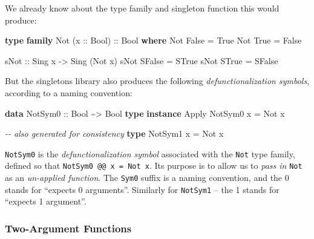 \documentclass[]{article}
\newenvironment{Shaded}{}{}
\newcommand{\CommentTok}[1]{\textcolor[rgb]{0.38,0.63,0.69}{\textit{#1}}}
\newcommand{\DataTypeTok}[1]{\textcolor[rgb]{0.56,0.13,0.00}{#1}}
\newcommand{\KeywordTok}[1]{\textcolor[rgb]{0.00,0.44,0.13}{\textbf{#1}}}
\newcommand{\NormalTok}[1]{#1}
\newcommand{\OperatorTok}[1]{\textcolor[rgb]{0.40,0.40,0.40}{#1}}
\newcommand{\OtherTok}[1]{\textcolor[rgb]{0.00,0.44,0.13}{#1}}
\begin{document}
We already know about the type family and singleton function this would produce:

\begin{Shaded}
\begin{Highlighting}[]
\KeywordTok{type} \KeywordTok{family} \DataTypeTok{Not}\NormalTok{ (}\OtherTok{x ::} \DataTypeTok{Bool}\NormalTok{)}\OtherTok{ ::} \DataTypeTok{Bool} \KeywordTok{where}
    \DataTypeTok{Not} \DataTypeTok{\textquotesingle{}False} \OtherTok{=} \DataTypeTok{\textquotesingle{}True}
    \DataTypeTok{Not} \DataTypeTok{\textquotesingle{}True}  \OtherTok{=} \DataTypeTok{\textquotesingle{}False}

\OtherTok{sNot ::} \DataTypeTok{Sing}\NormalTok{ x }\OtherTok{{-}\textgreater{}} \DataTypeTok{Sing}\NormalTok{ (}\DataTypeTok{Not}\NormalTok{ x)}
\NormalTok{sNot }\DataTypeTok{SFalse} \OtherTok{=} \DataTypeTok{STrue}
\NormalTok{sNot }\DataTypeTok{STrue}  \OtherTok{=} \DataTypeTok{SFalse}
\end{Highlighting}
\end{Shaded}

But the singletons library also produces the following \emph{defunctionalization
symbols}, according to a naming convention:

\begin{Shaded}
\begin{Highlighting}[]
\KeywordTok{data} \DataTypeTok{NotSym0}\OtherTok{ ::} \DataTypeTok{Bool} \OperatorTok{\textasciitilde{}\textgreater{}} \DataTypeTok{Bool}
\KeywordTok{type} \KeywordTok{instance} \DataTypeTok{Apply} \DataTypeTok{NotSym0}\NormalTok{ x }\OtherTok{=} \DataTypeTok{Not}\NormalTok{ x}

\CommentTok{{-}{-} also generated for consistency}
\KeywordTok{type} \DataTypeTok{NotSym1}\NormalTok{ x }\OtherTok{=} \DataTypeTok{Not}\NormalTok{ x}
\end{Highlighting}
\end{Shaded}

\texttt{NotSym0} is the \emph{defunctionalization symbol} associated with the
\texttt{Not} type family, defined so that \texttt{NotSym0\ @@\ x\ =\ Not\ x}.
Its purpose is to allow us to \emph{pass in} \texttt{Not} as an \emph{un-applied
function}. The \texttt{Sym0} suffix is a naming convention, and the 0 stands for
``expects 0 arguments''. Similarly for \texttt{NotSym1} -- the 1 stands for
``expects 1 argument''.

\subsubsection{Two-Argument Functions}\label{two-argument-functions}
\end{document}
